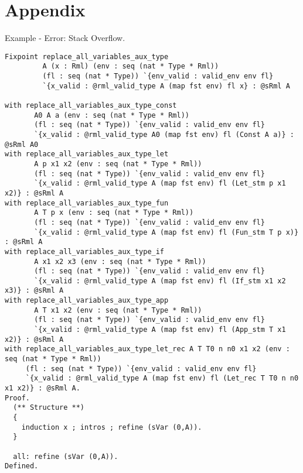 \documentclass[11pt, leqno]{article}
\theoremstyle{definition}
\begin{document}
\section{Appendix}
Example - Error: Stack Overflow.
\begin{lstlisting}[language=coq]
Fixpoint replace_all_variables_aux_type
         A (x : Rml) (env : seq (nat * Type * Rml))
         (fl : seq (nat * Type)) `{env_valid : valid_env env fl}
         `{x_valid : @rml_valid_type A (map fst env) fl x} : @sRml A
                                                                            
with replace_all_variables_aux_type_const
       A0 A a (env : seq (nat * Type * Rml))
       (fl : seq (nat * Type)) `{env_valid : valid_env env fl}
       `{x_valid : @rml_valid_type A0 (map fst env) fl (Const A a)} : @sRml A0
with replace_all_variables_aux_type_let
       A p x1 x2 (env : seq (nat * Type * Rml))
       (fl : seq (nat * Type)) `{env_valid : valid_env env fl}
       `{x_valid : @rml_valid_type A (map fst env) fl (Let_stm p x1 x2)} : @sRml A
with replace_all_variables_aux_type_fun
       A T p x (env : seq (nat * Type * Rml))
       (fl : seq (nat * Type)) `{env_valid : valid_env env fl}
       `{x_valid : @rml_valid_type A (map fst env) fl (Fun_stm T p x)} : @sRml A
with replace_all_variables_aux_type_if
       A x1 x2 x3 (env : seq (nat * Type * Rml))
       (fl : seq (nat * Type)) `{env_valid : valid_env env fl}
       `{x_valid : @rml_valid_type A (map fst env) fl (If_stm x1 x2 x3)} : @sRml A
with replace_all_variables_aux_type_app
       A T x1 x2 (env : seq (nat * Type * Rml))
       (fl : seq (nat * Type)) `{env_valid : valid_env env fl}
       `{x_valid : @rml_valid_type A (map fst env) fl (App_stm T x1 x2)} : @sRml A
with replace_all_variables_aux_type_let_rec A T T0 n n0 x1 x2 (env : seq (nat * Type * Rml))
     (fl : seq (nat * Type)) `{env_valid : valid_env env fl}
     `{x_valid : @rml_valid_type A (map fst env) fl (Let_rec T T0 n n0 x1 x2)} : @sRml A.
Proof.
  (** Structure **)
  {
    induction x ; intros ; refine (sVar (0,A)).
  }
  
  all: refine (sVar (0,A)).  
Defined.
\end{lstlisting}
\end{document}
